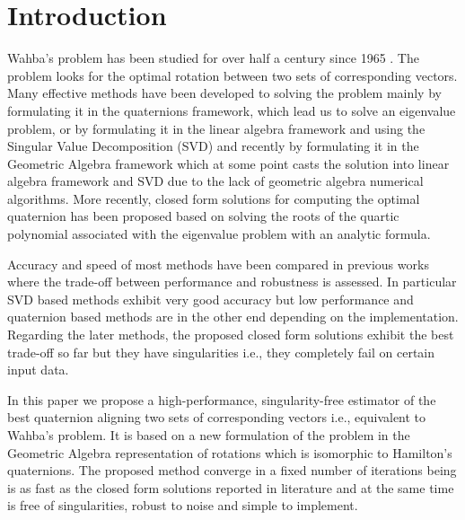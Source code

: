 \documentclass{birkjour}
\numberwithin{equation}{section}
\begin{document}
\maketitle
\section{Introduction}

\indent Wahba's problem has been studied for over half a century since 1965 \cite{Wahba1965}. The problem looks for the optimal rotation between two sets of corresponding vectors. Many effective methods have been developed to solving the problem \cite{Arun1987, Horn1987, Mortari1996, Shuster1981, Yang2015} mainly by formulating it in the quaternions framework, which lead us to solve an eigenvalue problem, or by formulating it in the linear algebra framework and using the Singular Value Decomposition (SVD) and recently by formulating it in the Geometric Algebra framework \cite{Perwass2009, Dorst2011} which at some point casts the solution into linear algebra framework and SVD due to the lack of geometric algebra numerical algorithms. More recently, closed form solutions for computing the optimal quaternion has been proposed \cite{Yang2013, Wu2017, Wu2018FA3R, Wu2018FS3R} based on solving the roots of the quartic polynomial associated with the eigenvalue problem with an analytic formula.

Accuracy and speed of most methods have been compared in previous works \cite{Eggert1997, Markley1999, Wu2017} where the trade-off between performance and robustness is assessed. In particular SVD based methods exhibit very good accuracy but low performance and quaternion based methods are in the other end depending on the implementation. Regarding the later methods, the proposed closed form solutions exhibit the best trade-off so far but they have singularities i.e., they completely fail on certain input data.

In this paper we propose a high-performance, singularity-free estimator of the best quaternion aligning two sets of corresponding vectors i.e., equivalent to Wahba's problem. It is based on a new formulation of the problem  in the Geometric Algebra representation of rotations which is isomorphic to Hamilton's quaternions.  The proposed method converge in a fixed number of iterations being is as fast as the closed form solutions reported in literature and at the same time is free of singularities, robust to noise and simple to implement.
\end{document}
